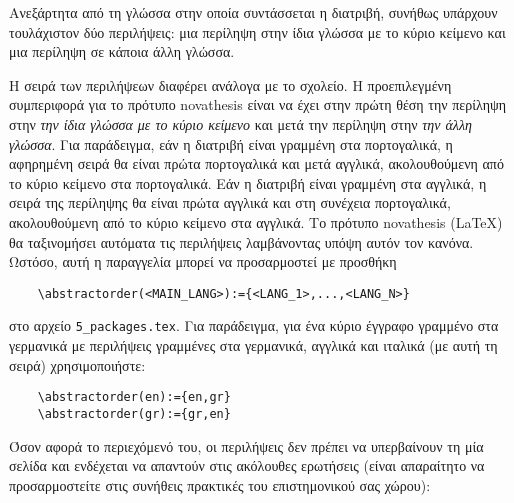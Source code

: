 
%


Ανεξάρτητα από τη γλώσσα στην οποία συντάσσεται η διατριβή, συνήθως υπάρχουν τουλάχιστον δύο περιλήψεις: μια περίληψη στην ίδια γλώσσα με το κύριο κείμενο και μια περίληψη σε κάποια άλλη γλώσσα.

Η σειρά των περιλήψεων διαφέρει ανάλογα με το σχολείο. Η προεπιλεγμένη συμπεριφορά για το πρότυπο \gls{novathesis} είναι να έχει στην πρώτη θέση την περίληψη στην \emph{την ίδια γλώσσα με το κύριο κείμενο} και μετά την περίληψη στην \emph{την άλλη γλώσσα}. Για παράδειγμα, εάν η διατριβή είναι γραμμένη στα πορτογαλικά, η αφηρημένη σειρά θα είναι πρώτα πορτογαλικά και μετά αγγλικά, ακολουθούμενη από το κύριο κείμενο στα πορτογαλικά. Εάν η διατριβή είναι γραμμένη στα αγγλικά, η σειρά της περίληψης θα είναι πρώτα αγγλικά και στη συνέχεια πορτογαλικά, ακολουθούμενη από το κύριο κείμενο στα αγγλικά.
%
Το πρότυπο \gls{novathesis} (\LaTeX) θα ταξινομήσει αυτόματα τις περιλήψεις λαμβάνοντας υπόψη αυτόν τον κανόνα. Ωστόσο, αυτή η παραγγελία μπορεί να προσαρμοστεί με προσθήκη
\begin{otherlanguage}{english}
\begin{verbatim}
    \abstractorder(<MAIN_LANG>):={<LANG_1>,...,<LANG_N>}
\end{verbatim}
\end{otherlanguage}
\noindent στο αρχείο \verb!5_packages.tex!. Για παράδειγμα, για ένα κύριο έγγραφο γραμμένο στα γερμανικά με περιλήψεις γραμμένες στα γερμανικά, αγγλικά και ιταλικά (με αυτή τη σειρά) χρησιμοποιήστε:
\begin{otherlanguage}{english}
\begin{verbatim}
    \abstractorder(en):={en,gr}
    \abstractorder(gr):={gr,en}
\end{verbatim}
\end{otherlanguage}
Όσον αφορά το περιεχόμενό του, οι περιλήψεις δεν πρέπει να υπερβαίνουν τη μία σελίδα και ενδέχεται να απαντούν στις ακόλουθες ερωτήσεις (είναι απαραίτητο να προσαρμοστείτε στις συνήθεις πρακτικές του επιστημονικού σας χώρου):

